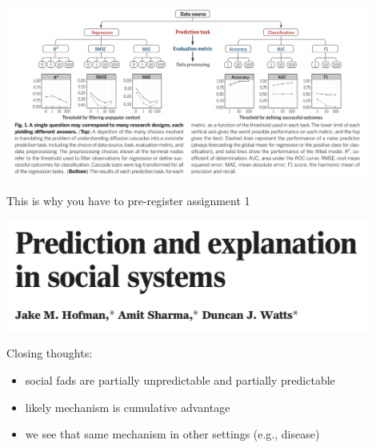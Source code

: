 \documentclass[aspectratio=169]{beamer}
\begin{document}
\begin{frame}

\begin{center}
\includegraphics[width=0.9\textwidth]{figures/hofman_prediction_2017_fig1}
\end{center}

\vfill
This is why you have to pre-register assignment 1

\end{frame}
\begin{frame}

\begin{center}
\includegraphics[width=0.9\textwidth]{figures/hofman_prediction_2017_title}
\end{center}

\end{frame}
\begin{frame}

Closing thoughts:
\begin{itemize}
\item social fads are partially unpredictable and partially predictable
\pause
\item likely mechanism is cumulative advantage
\pause
\item we see that same mechanism in other settings (e.g., disease)
\end{itemize}

\end{frame}


\frame{\titlepage}
\end{document}
